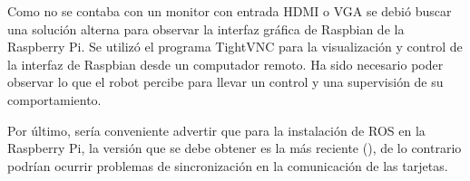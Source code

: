 Como no se contaba con un monitor con entrada HDMI o VGA se debió buscar una solución alterna para observar la interfaz gráfica de Raspbian de la Raspberry Pi. Se utilizó el programa TightVNC para la visualización y control de la interfaz de Raspbian desde un computador remoto. Ha sido necesario poder observar lo que el robot percibe para llevar un control y una supervisión de su comportamiento. 

Por último, sería conveniente advertir que para la instalación de ROS en la Raspberry Pi, la versión que se debe obtener es la más reciente (), de lo contrario podrían ocurrir problemas de sincronización en la comunicación de las tarjetas.   



